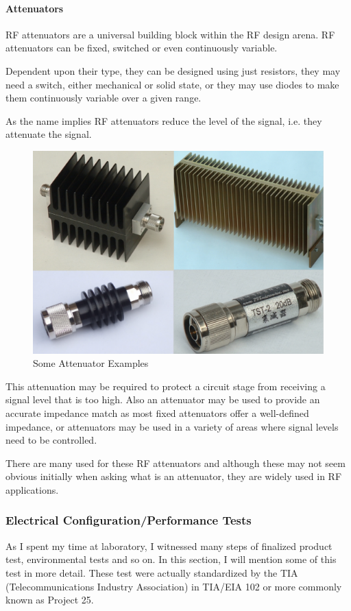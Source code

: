 \paragraph{Attenuators} 
\- \indent
	RF attenuators are a universal building block within the RF design arena. RF attenuators can be fixed, switched or even continuously variable.

Dependent upon their type, they can be designed using just resistors, they may need a switch, either mechanical or solid state, or they may use diodes to make them continuously variable over a given range.

	As the name implies RF attenuators reduce the level of the signal, i.e. they attenuate the signal.

\begin{figure}[H]
	\center
	\setlength{\unitlength}{\textwidth} 
	\includegraphics[width=0.5\unitlength]{attn}
	\caption{\label{fig:attn}Some Attenuator Examples }
\end{figure}

	This attenuation may be required to protect a circuit stage from receiving a signal level that is too high. Also an attenuator may be used to provide an accurate impedance match as most fixed attenuators offer a well-defined impedance, or attenuators may be used in a variety of areas where signal levels need to be controlled.

	There are many used for these RF attenuators and although these may not seem obvious initially when asking what is an attenuator, they are widely used in RF applications.




\subsubsection{Electrical Configuration/Performance Tests}
\- \indent
	As I spent my time at laboratory, I witnessed many steps of finalized product test, environmental tests and so on. In this section, I will mention some of this test in more detail. These test were actually standardized by the TIA (Telecommunications Industry Association) in TIA/EIA 102 or more commonly known as Project 25.

